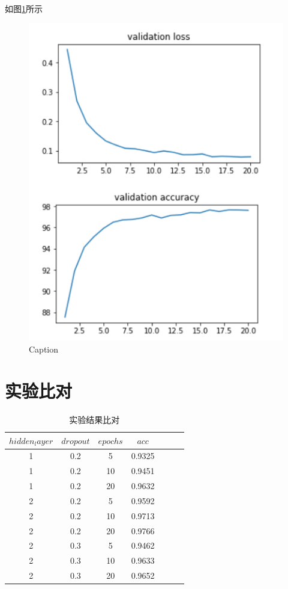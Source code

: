 \documentclass[UTF8,a4paper,10pt]{ctexart}
\begin{document}
如图\ref{fig:1}所示
\begin{figure}[H]
    \centering
    \includegraphics[scale=0.3]{4.png}
    \caption{Caption}
    \label{fig:1}
\end{figure}

\section{实验比对}

\begin{table}[!htbp]
    \centering
    \begin{tabular}{|c|c|c|c|c|c|c|}
    \hline
    $hidden_layer$&$dropout$&$epochs$&$acc$\\
    \hline
    1&0.2&5&0.9325\\
    \hline
    1&0.2&10&0.9451\\
    \hline
    1&0.2&20&0.9632\\
    \hline
    2&0.2&5&0.9592\\
    \hline
    2&0.2&10&0.9713\\
    \hline
    2&0.2&20&0.9766\\
    \hline
    2&0.3&5&0.9462\\
    \hline
    2&0.3&10&0.9633\\
    \hline
    2&0.3&20&0.9652\\
    \hline
    \end{tabular}
    \caption{实验结果比对}
  \end{table}



\end{document}
